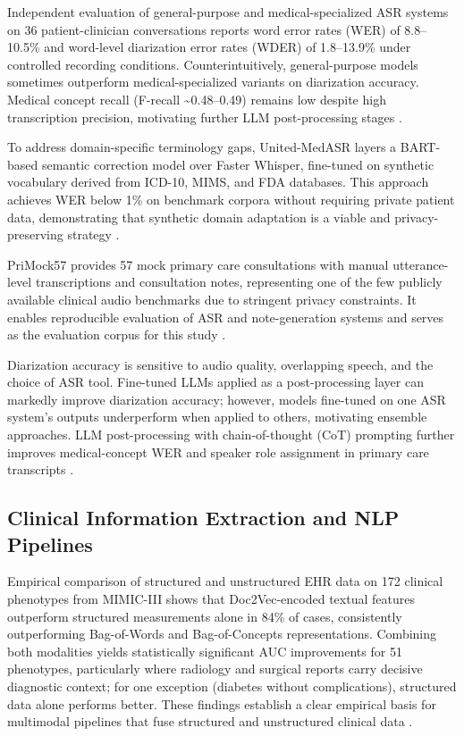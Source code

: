 Independent evaluation of general-purpose and medical-specialized ASR systems on 36 patient-clinician conversations reports word error rates (WER) of 8.8–10.5\% and word-level diarization error rates (WDER) of 1.8–13.9\% under controlled recording conditions. Counterintuitively, general-purpose models sometimes outperform medical-specialized variants on diarization accuracy. Medical concept recall (F-recall \textasciitilde{}0.48–0.49) remains low despite high transcription precision, motivating further LLM post-processing stages \cite{tran2022asr}.

To address domain-specific terminology gaps, United-MedASR layers a BART-based semantic correction model over Faster Whisper, fine-tuned on synthetic vocabulary derived from ICD-10, MIMS, and FDA databases. This approach achieves WER below 1\% on benchmark corpora without requiring private patient data, demonstrating that synthetic domain adaptation is a viable and privacy-preserving strategy \cite{banerjee2024medasr}.

PriMock57 provides 57 mock primary care consultations with manual utterance-level transcriptions and consultation notes, representing one of the few publicly available clinical audio benchmarks due to stringent privacy constraints. It enables reproducible evaluation of ASR and note-generation systems and serves as the evaluation corpus for this study \cite{papadopoulos2022primock57}.

Diarization accuracy is sensitive to audio quality, overlapping speech, and the choice of ASR tool. Fine-tuned LLMs applied as a post-processing layer can markedly improve diarization accuracy; however, models fine-tuned on one ASR system's outputs underperform when applied to others, motivating ensemble approaches. LLM post-processing with chain-of-thought (CoT) prompting further improves medical-concept WER and speaker role assignment in primary care transcripts \cite{efstathiadis2024diarization, adedeji2024sound}.

\subsection{Clinical Information Extraction and NLP Pipelines}
Empirical comparison of structured and unstructured EHR data on 172 clinical phenotypes from MIMIC-III shows that Doc2Vec-encoded textual features outperform structured measurements alone in 84\% of cases, consistently outperforming Bag-of-Words and Bag-of-Concepts representations. Combining both modalities yields statistically significant AUC improvements for 51 phenotypes, particularly where radiology and surgical reports carry decisive diagnostic context; for one exception (diabetes without complications), structured data alone performs better. These findings establish a clear empirical basis for multimodal pipelines that fuse structured and unstructured clinical data \cite{moldwin2021phenotyping}.

